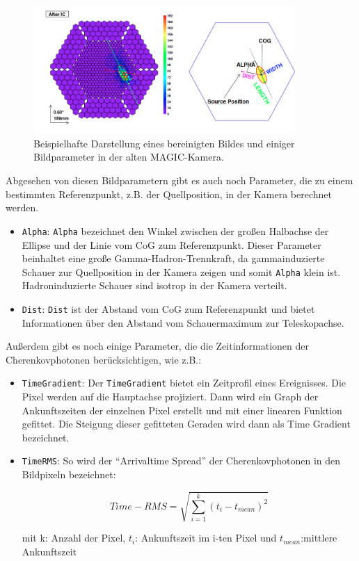 \begin{figure}
    \centering
    \includegraphics[width=0.9\textwidth]{./Plots/03_MonteCarlos/CleaningBild.png}
    \caption{Beispielhafte Darstellung eines bereinigten Bildes und einiger Bildparameter in der alten MAGIC-Kamera.\cite{ImageCleaning}}
    \label{CleaningBild}
\end{figure}

Abgesehen von diesen Bildparametern gibt es auch noch Parameter, die zu einem bestimmten Referenzpunkt, z.B. der Quellposition, in der Kamera berechnet werden. 

\begin{itemize}
 \item \texttt{Alpha}: \texttt{Alpha} bezeichnet den Winkel zwischen der großen Halbachse der Ellipse und der Linie vom CoG zum Referenzpunkt.
 Dieser Parameter beinhaltet eine große Gamma-Hadron-Trennkraft, da gammainduzierte Schauer zur Quellposition in der Kamera zeigen und somit \texttt{Alpha} klein ist.
 Hadroninduzierte Schauer sind isotrop in der Kamera verteilt.
 \item \texttt{Dist}: \texttt{Dist} ist der Abstand vom CoG zum Referenzpunkt und bietet Informationen über den Abstand vom Schauermaximum zur Teleskopachse.
\end{itemize}

Außerdem gibt es noch einige Parameter, die die Zeitinformationen der Cherenkovphotonen berücksichtigen, wie z.B.:

\begin{itemize}
 \item \texttt{TimeGradient}: Der \texttt{TimeGradient} bietet ein Zeitprofil eines Ereignisses.
 Die Pixel werden auf die Hauptachse projiziert.
 Dann wird ein Graph der Ankunftszeiten der einzelnen Pixel erstellt und mit einer linearen Funktion gefittet.
 Die Steigung dieser gefitteten Geraden wird dann als Time Gradient bezeichnet.
 \item \texttt{TimeRMS}: So wird der ``Arrivaltime Spread'' der Cherenkovphotonen in den Bildpixeln bezeichnet:
  
  \newpage
  
\begin{equation}
 Time-RMS=\sqrt{\sum_{i=1}^k (t_i-t_{mean})^2}
\end{equation}
 \begin{center}
  \small{mit k: Anzahl der Pixel, $t_i$: Ankunftszeit im i-ten Pixel und $t_{mean}$:mittlere Ankunftszeit}
 \end{center}

\end{itemize}

